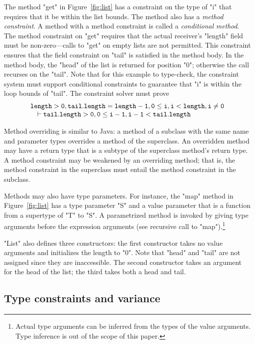 The method \xcd"get" in Figure~\ref{fig:list}
has a constraint on the type of \xcd"i" that requires
that it be within the list bounds.
The method also has a \emph{method constraint}.
A method with a method constraint is called a \emph{conditional method}.
The method constraint on \xcd"get" requires that the actual
receiver's
\xcd"length" field must be non-zero---calls to \xcd"get" on empty lists are not
permitted.  This constraint ensures that the field constraint on
\xcd"tail" is satisfied in the method body.
In the method body, the \xcd"head" of the list is returned for
position \xcd"0"; otherwise the call recurses on the \xcd"tail".
Note that for this example to type-check, the constraint system
must support conditional constraints
to
guarantee that \xcd"i" is within the loop bounds of \xcd"tail".
The constraint solver must prove
{\footnotesize
$$
\begin{array}[t]{l}
\tt length > 0, tail.length=length-1, 0 \leq i, i < length, i \not= 0 \\
\tt \quad\vdash tail.length > 0, 0 \leq i-1,i-1 < tail.length 
\end{array}
$$}

Method overriding is similar to Java: a method of a subclass
with the same name and parameter types overrides a method of the
superclass.  An overridden method may have a return type that is
a subtype of the superclass method's return type.
A method constraint may be weakened by an overriding
method; that is, the method constraint in the superclass must entail the  
method constraint in the subclass.

Methods may also have type parameters.  
For instance, the \xcd"map" method in Figure~\ref{fig:list} 
has a type parameter \xcd"S" and a value parameter that is a
function from a supertype of \xcd"T" to \xcd"S".
A parametrized method is invoked by giving type arguments before the
expression arguments (see recursive call to
\xcd"map").\footnote{Actual type arguments can be inferred from the types
of the value arguments. Type inference is out of the scope of this paper.}

\xcd"List" also defines three constructors: the first
constructor takes no value arguments and initializes
the length to \xcd"0".  Note that \xcd"head" and \xcd"tail" are
not assigned since they are inaccessible.
The second constructor takes an argument for the head of the
list; the third takes both a head and tail.

\subsection{Type constraints and variance}
\label{sec:variance}

